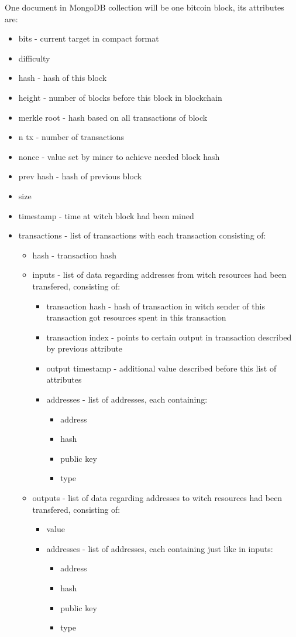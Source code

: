 \documentclass[12pt, en, eng]{mgr}
\begin{document}
One document in MongoDB collection will be one bitcoin block, its attributes are:
\begin{itemize}
\item
bits - current target in compact format \cite{bitcoin-wiki-bha}
\item
difficulty
\item
hash - hash of this block
\item
height - number of blocks before this block in blockchain
\item
merkle root - hash based on all transactions of block
\item
n tx - number of transactions
\item
nonce - value set by miner to achieve needed block hash
\item
prev hash - hash of previous block
\item
size
\item
timestamp - time at witch block had been mined
\item
transactions - list of transactions with each transaction consisting of:
\begin{itemize}
\item
hash - transaction hash
\item
inputs - list of data regarding addresses from witch resources had been transfered, consisting of:
\begin{itemize}
\item
transaction hash - hash of transaction in witch sender of this transaction got resources spent in this transaction
\item
transaction index - points to certain output in transaction described by previous attribute
\item
output timestamp - additional value described before this list of attributes
\item addresses - list of addresses, each containing:
\begin{itemize}
\item
address
\item
hash
\item
public key
\item
type
\end{itemize}
\end{itemize}	
\item
outputs - list of data regarding addresses to witch resources had been transfered, consisting of:	
\begin{itemize}
\item
value
\item addresses - list of addresses, each containing just like in inputs:
\begin{itemize}
\item
address
\item
hash
\item
public key
\item
type
\end{itemize}
\end{itemize} 	
\end{itemize}
\end{itemize}
\end{document}
